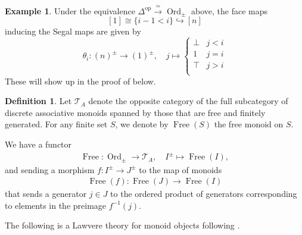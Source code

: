 \documentclass[12pt, reqno]{amsart}
\theoremstyle{plain}
\theoremstyle{definition}
\newtheorem{definition}[theorem]{Definition}
\newtheorem{example}[theorem]{Example}
\begin{document}
\begin{example}\label{face map}
Under the equivalence $\Delta^{\operatorname{op}}\xrightarrow{\ \simeq \ } \operatorname{Ord}_\pm$ above, the face maps
$$[1] \cong \{i-1<i\} \hookrightarrow [n]$$
inducing the Segal maps are given by
\begin{equation}
\theta_i\colon (n)^\pm \rightarrow (1)^\pm,\quad j\mapsto \begin{cases}
\bot & j<i \\
1 & j=i \\
\top & j>i \\
\end{cases}
\end{equation}
These will show up in the proof of  below.
\end{example}


\begin{definition}
Let $\mathcal{T}_A$ denote the opposite category of the full subcategory of discrete associative monoids spanned by those that are free and finitely generated. For any finite set $S$, we denote by $\operatorname{Free}(S)$ the free monoid on $S$.
\end{definition}

We have a functor
\begin{align*}
\operatorname{Free}\colon \operatorname{Ord}_\pm \rightarrow \mathcal{T}_A,\quad I^\pm \mapsto \operatorname{Free}(I),
\end{align*}
and sending a morphism $f\colon I^\pm \rightarrow J^\pm$ to the map of monoids
\begin{align*}
\operatorname{Free}(f)\colon \operatorname{Free}(J)\rightarrow \operatorname{Free}(I)
\end{align*}
that sends a generator $j\in J$ to the ordered product of generators corresponding to elements in the preimage $f^{-1}(j)$.

The following is a Lawvere theory for monoid objects following \cite[Proposition 5.6]{Yuan}.
\end{document}
